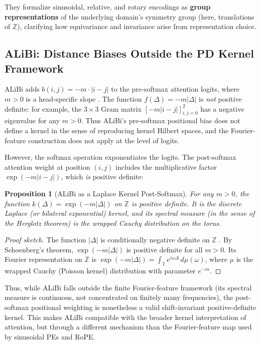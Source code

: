 \documentclass[11pt]{article}
\newtheorem{proposition}[theorem]{Proposition}
\theoremstyle{definition}
\begin{document}
They formalize sinusoidal, relative, and rotary encodings as \textbf{group representations} of the underlying domain's symmetry group (here, translations of \(\mathbb{Z}\)), clarifying how equivariance and invariance arise from representation choice.

\subsection{ALiBi: Distance Biases Outside the PD Kernel Framework}
\label{sec:alibi-analysis}

ALiBi adds $b(i,j) = -m \cdot |i-j|$ to the pre-softmax attention logits, where $m > 0$ is a head-specific slope \cite{press2022train}. The function $f(\Delta) = -m|\Delta|$ is \emph{not} positive definite: for example, the $3 \times 3$ Gram matrix $[-m|i-j|]_{i,j=0}^{2}$ has a negative eigenvalue for any $m > 0$. Thus ALiBi's pre-softmax positional bias does not define a kernel in the sense of reproducing kernel Hilbert spaces, and the Fourier-feature construction does not apply at the level of logits.

However, the softmax operation exponentiates the logits. The post-softmax attention weight at position $(i,j)$ includes the multiplicative factor $\exp(-m|i-j|)$, which \emph{is} positive definite:

\begin{proposition}[ALiBi as a Laplace Kernel Post-Softmax]
\label{prop:alibi-pd}
For any $m > 0$, the function $k(\Delta) = \exp(-m|\Delta|)$ on $\mathbb{Z}$ is positive definite. It is the discrete Laplace (or bilateral exponential) kernel, and its spectral measure (in the sense of the Herglotz theorem) is the wrapped Cauchy distribution on the torus.
\end{proposition}

\begin{proof}[Proof sketch]
The function $|\Delta|$ is conditionally negative definite on $\mathbb{Z}$ \cite{schoenberg1938metric}. By Schoenberg's theorem, $\exp(-m|\Delta|)$ is positive definite for all $m > 0$. Its Fourier representation on $\mathbb{Z}$ is $\exp(-m|\Delta|) = \int_{\mathbb{T}} e^{i\omega\Delta} \, d\mu(\omega)$, where $\mu$ is the wrapped Cauchy (Poisson kernel) distribution with parameter $e^{-m}$.
\end{proof}

Thus, while ALiBi falls outside the finite Fourier-feature framework (its spectral measure is continuous, not concentrated on finitely many frequencies), the post-softmax positional weighting is nonetheless a valid shift-invariant positive-definite kernel. This makes ALiBi compatible with the broader kernel interpretation of attention, but through a different mechanism than the Fourier-feature map used by sinusoidal PEs and RoPE.
\end{document}
